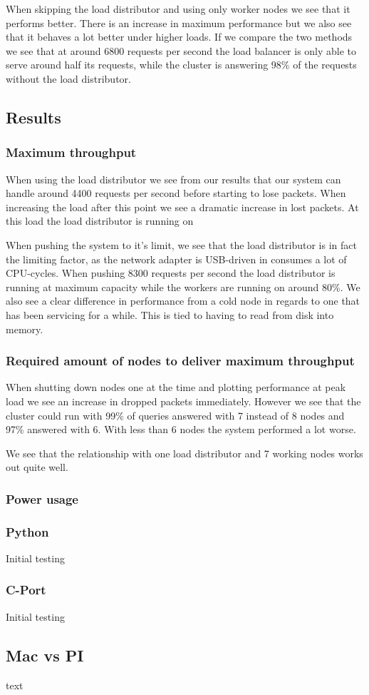 When skipping the load distributor and using only worker nodes we see that it performs better. There is an increase in maximum performance but we also see that it behaves a lot better under higher loads. If we compare the two methods we see that at around 6800 requests per second the load balancer 
is only able to serve around half its requests, while the cluster is answering 98\% of the requests without the load distributor.   




\subsection{Results}
\subsubsection{Maximum throughput}
When using the load distributor we see from our results that our system can handle around 4400 requests per second before starting to lose packets. When increasing the load after this point we see a dramatic increase in lost packets. At this load the load distributor is running on 

 

When pushing the system to it's limit, we see that the load distributor is in fact the limiting factor, as the network adapter is USB-driven in consumes a lot of CPU-cycles. When pushing 8300 requests per second the load distributor is running at maximum capacity while the workers are running on around 80\%. We also see a clear difference in performance from a cold node in regards to one that has been servicing for a while. This is tied to having to read from disk into memory.

\subsubsection{Required amount of nodes to deliver maximum throughput}
When shutting down nodes one at the time and plotting performance at peak load we see an increase in dropped packets immediately. However we see that the cluster could run with 99\% of queries answered with 7 instead of 8 nodes and 97\% answered with 6. With less than 6 nodes the system performed a lot worse. 

We see that the relationship with one load distributor and 7 working nodes works out quite well.

\subsubsection{Power usage}



\subsubsection{Python}
Initial testing

\subsubsection{C-Port}
Initial testing
\subsection{Mac vs PI}
text

